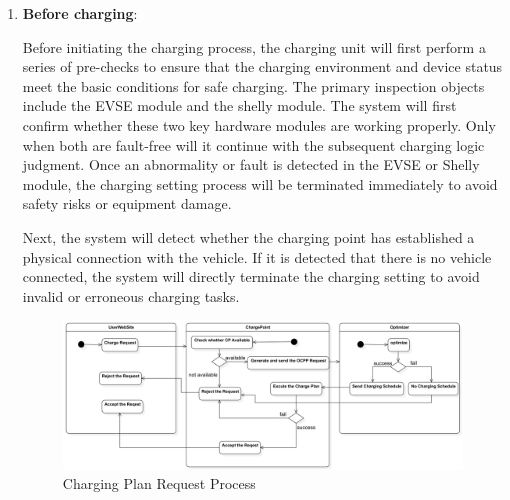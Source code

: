 \documentclass[
	english,
	ruledheaders=section,%
	class=report,%
	thesis={type=Report},%
	accentcolor=9c,%
	custommargins=true,%
	marginpar=false,%
	parskip=half-,%
	fontsize=11pt,%
	logofile={img/tuda_logo.pdf}, %
]{tudapub}
\begin{document}
\begin{enumerate}[label=\Alph*.]

    \item \textbf{Before charging}:
    \label{item:beforeCharging}
    
    Before initiating the charging process, the charging unit will first perform a series of pre-checks to ensure that the charging environment and device status meet the basic conditions for safe charging. The primary inspection objects include the EVSE module and the shelly module. The system will first confirm whether these two key hardware modules are working properly. Only when both are fault-free will it continue with the subsequent charging logic judgment. Once an abnormality or fault is detected in the EVSE or Shelly module, the charging setting process will be terminated immediately to avoid safety risks or equipment damage. 
    
    Next, the system will detect whether the charging point has established a physical connection with the vehicle. If it is detected that there is no vehicle connected, the system will directly terminate the charging setting to avoid invalid or erroneous charging tasks. 
    
    
    \begin{figure}
        \centering
        \includegraphics[width=1\linewidth]{img/ChargingRequestDiagram.png}
        \caption{Charging Plan Request Process}
        \label{fig: chargingRequestDiagram}
    \end{figure}
    

\end{enumerate}
\end{document}
